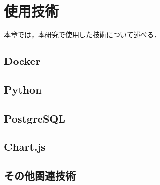 \section{使用技術}\label{sec2}

本章では，本研究で使用した技術について述べる．

\subsection{Docker}


\subsection{Python}


\subsection{PostgreSQL}


\subsection{Chart.js}


\subsection{その他関連技術}
